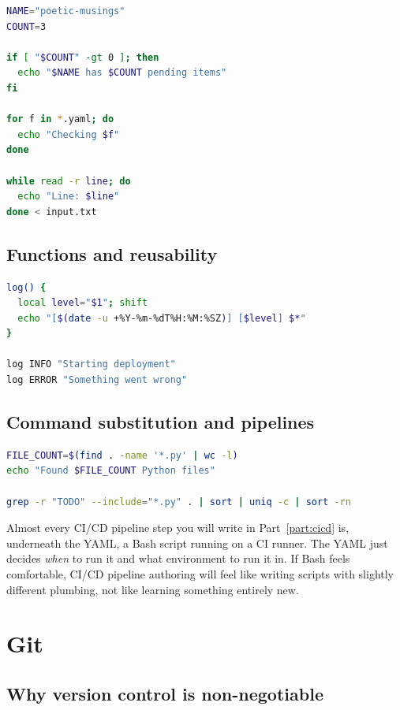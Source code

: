 \documentclass[11pt,twoside,openright]{book}
\begin{document}
\begin{lstlisting}[language=bash]
NAME="poetic-musings"
COUNT=3

if [ "$COUNT" -gt 0 ]; then
  echo "$NAME has $COUNT pending items"
fi

for f in *.yaml; do
  echo "Checking $f"
done

while read -r line; do
  echo "Line: $line"
done < input.txt
\end{lstlisting}

\section{Functions and reusability}

\begin{lstlisting}[language=bash]
log() {
  local level="$1"; shift
  echo "[$(date -u +%Y-%m-%dT%H:%M:%SZ)] [$level] $*"
}

log INFO "Starting deployment"
log ERROR "Something went wrong"
\end{lstlisting}

\section{Command substitution and pipelines}

\begin{lstlisting}[language=bash]
FILE_COUNT=$(find . -name '*.py' | wc -l)
echo "Found $FILE_COUNT Python files"

grep -r "TODO" --include="*.py" . | sort | uniq -c | sort -rn
\end{lstlisting}

\begin{note}
Almost every CI/CD pipeline step you will write in Part~\ref{part:cicd} is, underneath the
YAML, a Bash script running on a CI runner. The YAML just decides \emph{when} to run it and
what environment to run it in. If Bash feels comfortable, CI/CD pipeline authoring will
feel like writing scripts with slightly different plumbing, not like learning something
entirely new.
\end{note}

\chapter{Git}

\section{Why version control is non-negotiable}
\end{document}

